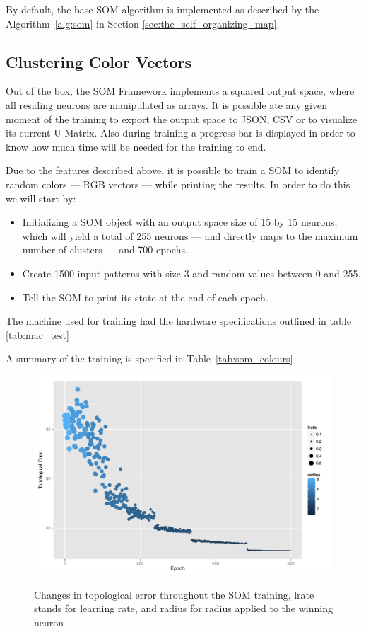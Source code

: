 By default, the base SOM algorithm is implemented as described by the Algorithm~\ref{alg:som} in Section \ref{sec:the_self_organizing_map}. 
\subsection{Clustering Color Vectors}
\label{sub:main_features}
Out of the box, the \ac{SOM} Framework implements a squared output space, where all residing neurons are manipulated as arrays. It is possible ate any given moment of the training to export the output space to \ac{JSON}, \ac{CSV} or to visualize its current \ac{U-Matrix}. Also during training a progress bar is displayed in order to know how much time will be needed for the training to end.

Due to the features described above, it is possible to train a \ac{SOM} to identify random colors --- RGB vectors --- while printing the results. In order to do this we will start by:
\begin{itemize}
  \item Initializing a SOM object with an output space size of 15 by 15 neurons, which will yield a total of 255 neurons --- and directly maps to the maximum number of clusters --- and 700 epochs.
  \item Create 1500 input patterns with size 3 and random values between 0 and 255. 
  \item Tell the SOM to print its state at the end of each epoch.
\end{itemize}
The machine used for training had the hardware specifications outlined in table \ref{tab:mac_test}



A summary of the training is specified in Table~\ref{tab:som_colours}


\begin{figure}[h]
  \includegraphics[scale=0.6]{./plots/som/topological_error.pdf}
  \label{fig:top_error}
  \caption{Changes in topological error throughout the SOM training, lrate stands for learning rate, and radius for radius applied to the winning neuron}
\end{figure}

